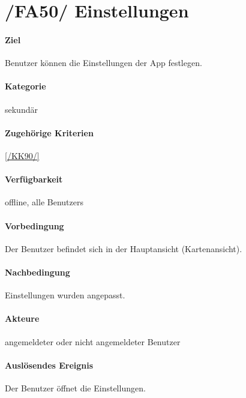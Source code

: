 \section[Einstellungen]{/FA50/ Einstellungen}
\label{/FA50/}
\paragraph{Ziel}
\Gls{Benutzer} können die Einstellungen der App festlegen.
\paragraph{Kategorie}
sekundär
\paragraph{Zugehörige Kriterien}
\ref{/KK90/}
\paragraph{Verfügbarkeit}
\gls{offline}, alle \Glspl{Benutzer}
\paragraph{Vorbedingung}
Der \Gls{Benutzer} befindet sich in der Hauptansicht (\Gls{Kartenansicht}).
\paragraph{Nachbedingung}
Einstellungen wurden angepasst.
\paragraph{Akteure}
angemeldeter oder nicht angemeldeter \Gls{Benutzer}
\paragraph{Auslösendes Ereignis}
Der \Gls{Benutzer} öffnet die Einstellungen.
